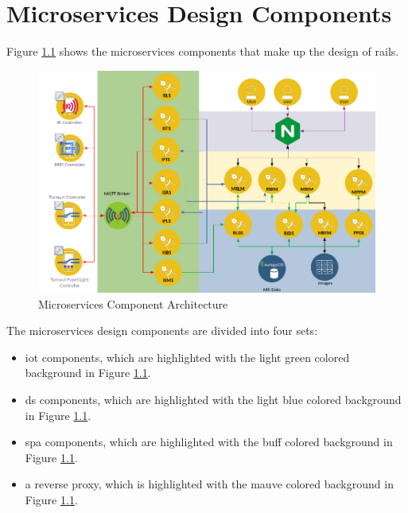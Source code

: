 \chapter{Microservices Design Components}
Figure \ref{fig:microarchitecture} shows the microservices components that make up the design of \gls{rails}.

\begin{figure}[H]
	\centering
		\includegraphics[scale=0.7]{design.png}
	\caption{Microservices Component Architecture}
	\label{fig:microarchitecture}
\end{figure}

The microservices design components are divided into four sets:
\begin{itemize}
  \item \gls{iot} components, which are highlighted with the light green colored background in Figure \ref{fig:microarchitecture}.
  \item \gls{ds} components, which are highlighted with the light blue colored background in Figure \ref{fig:microarchitecture}.
  \item \gls{spa} components, which are highlighted with the buff colored background in Figure \ref{fig:microarchitecture}.
  \item a reverse proxy, which is highlighted with the mauve colored background in Figure \ref{fig:microarchitecture}.
\end{itemize}

